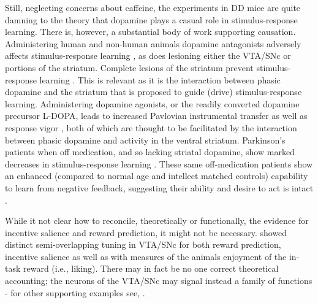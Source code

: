 Still, neglecting concerns about caffeine, the experiments in DD mice are quite damning to the theory that dopamine plays a casual role in stimulus-response learning.  There is, however, a substantial body of work supporting causation.  Administering human and non-human animals dopamine antagonists adversely affects stimulus-response learning \cite{Pizzagalli:2010p7205}, as does lesioning either the VTA/SNc or portions of the striatum.  Complete lesions of the striatum prevent stimulus-response learning \cite{Packard:2002p5074}.  This is relevant as it is the interaction between phasic dopamine and the striatum that is proposed to guide (drive) stimulus-response learning. Administering dopamine agonists, or the readily converted dopamine precursor L-DOPA, leads to increased Pavlovian instrumental transfer as well as response vigor \cite{Winterbauer:2007p6352}, both of which are thought to be facilitated by the interaction between phasic dopamine and activity in the ventral striatum.  Parkinson's patients when off medication, and so lacking striatal dopamine, show marked decreases in stimulus-response learning \cite{Pizzagalli:2010p7205}.  These same off-medication patients show an enhanced (compared to normal age and intellect matched controls) capability to learn from negative feedback, suggesting their ability and desire to act is intact \cite{Frank:2004p4709}.

While it not clear how to reconcile, theoretically or functionally, the evidence for incentive salience and reward prediction, it might not be necessary.   showed distinct semi-overlapping tuning in VTA/SNc for both reward prediction, incentive salience as well as with measures of the animals enjoyment of the in-task reward (i.e., liking). There may in fact be no one correct theoretical accounting; the neurons of the VTA/SNc may signal instead a family of functions - for other supporting examples see, .


